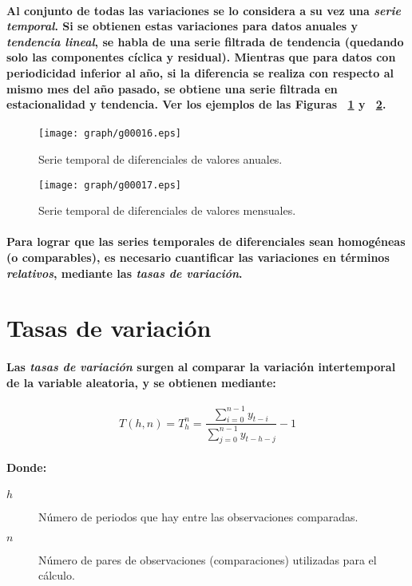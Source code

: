 \paragraph{
Al conjunto de todas las variaciones se lo considera a su vez una \emph{serie temporal}. Si se obtienen estas variaciones para datos anuales y \emph{tendencia lineal}, se habla de una serie filtrada de tendencia (quedando solo las componentes cíclica y residual). Mientras que para datos con periodicidad inferior al año, si la diferencia se realiza con respecto al mismo mes del año pasado, se obtiene una serie filtrada en estacionalidad y tendencia. Ver los ejemplos de las Figuras ~\ref{fig:EnfoqueCausalAnual} y ~\ref{fig:EnfoqueCausalMensual}.
}
\begin{figure}[ht]
\centering
\texttt{[image: graph/g00016.eps]}
\caption[Serie temporal de diferenciales anuales]{Serie temporal de diferenciales de valores anuales.}
\label{fig:EnfoqueCausalAnual}
\end{figure}
\begin{figure}[ht]
\centering
\texttt{[image: graph/g00017.eps]}
\caption[Serie temporal de diferenciales mensuales]{Serie temporal de diferenciales de valores mensuales.}
\label{fig:EnfoqueCausalMensual}
\end{figure}
\paragraph*{
Para lograr que las series temporales de diferenciales sean homogéneas (o comparables), es necesario cuantificar las variaciones en términos \emph{relativos}\footnotemark[6], mediante las \emph{tasas de variación}.
}



\section{Tasas de variación}
\paragraph{
Las \emph{tasas de variación} surgen al comparar la variación intertemporal de la variable aleatoria, y se obtienen mediante:
}
\begin{equation}
T(h,n) = T_h^n = \frac{\displaystyle\sum_{i=0}^{n-1}y_{t-i}}{\displaystyle\sum_{j=0}^{n-1}y_{t-h-j}}-1
\end{equation}
\paragraph{
Donde:
}
\begin{description}
\item[$h$] Número de periodos que hay entre las observaciones comparadas\footnotemark[7].
\item[$n$] Número de pares de observaciones (comparaciones) utilizadas para el cálculo.
\end{description}
